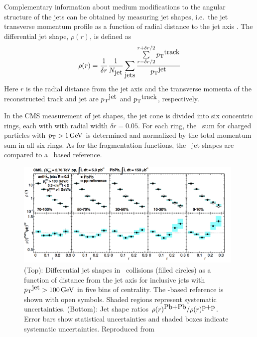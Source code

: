 Complementary information about medium modifications to the angular structure of the jets 
can be obtained by measuring jet shapes, i.e.\ the
jet transverse momentum profile as a function of radial distance to the jet axis
\cite{MehtarTani:2010ma,Idilbi:2008vm,CasalderreySolana:2011rz,
CasalderreySolana:2011rq,Neufeld:2011yh,Blaizot:2012fh,Fickinger:2013xwa}.
The differential jet shape, $\rho(r)$, is defined as
\begin{equation}
\rho(r) = \frac{1}{\delta r} \frac{1}{N_{\mbox{jet}}} \sum_{\mbox{jets}}
\frac{\sum\limits_{{r - \delta r/2}}^{{r + \delta r/2}}{\mbox{$p_{\mathrm{T}}$}^{\mbox{track}}}}{\mbox{$p_{\mathrm{T}}$}^{\mbox{jet}}}
\label{eq:rho(r)}
\end{equation}
Here $r$ is the radial distance from the jet axis
and the transverse momenta of the reconstructed track and jet are
$\mbox{$p_{\mathrm{T}}$}^{\mbox{jet}}$ and $\mbox{$p_{\mathrm{T}}$}^{\mbox{track}}$, respectively.

In the CMS measurement of jet shapes\cite{Chatrchyan:2013kwa}, the jet cone is divided 
into six concentric rings, each with with radial width $\delta r = 0.05$. For each
ring, the \pT\ sum for charged particles with $\mbox{$p_{\mathrm{T}}$} > 1\,\mathrm{GeV}$ is determined and
normalized by the total momentum sum in all six rings. As for the fragmentation
functions, the \PbPb\ jet shapes are compared to a \pp\ based reference.

\begin{figure}[!ht]
\begin{center}
\includegraphics[width=0.98\textwidth]{jetfigures/JetShapes_GR.png}
\caption{\label{fig:JSRatio}
(Top): Differential jet shapes in \PbPb\ collisions (filled circles)
as a function of distance from the jet axis for inclusive jets with $\mbox{$p_{\mathrm{T}}$}^{\mbox{jet}} >100\,\mathrm{GeV}$
in five bins of centrality.  The \pp-based reference is shown with open symbols.
Shaded regions represent systematic uncertainties.
(Bottom): Jet shape ratios $\rho(r)^{\mbox{Pb+Pb}}/\rho(r)^{\mbox{p+p}}$.
Error bars show statistical uncertainties and shaded boxes indicate systematic uncertainties. 
Reproduced from~\cite{Chatrchyan:2013kwa}}
\label{fig:GR:CMS_jetshapes}
\end{center}
\end{figure}

